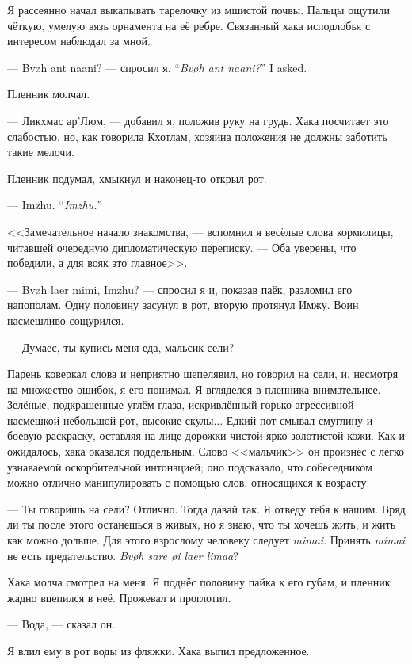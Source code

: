 Я рассеянно начал выкапывать тарелочку из мшистой почвы.
Пальцы ощутили чёткую, умелую вязь орнамента на её ребре.
Связанный хака исподлобья с интересом наблюдал за мной.

{--- Bv\o h ant naani? --- спросил я.}
{``\textit{Bv\o{}h ant naani?}'' I asked.}

Пленник молчал.

--- Ликхмас ар'Люм, --- добавил я, положив руку на грудь.
Хака посчитает это слабостью, но, как говорила Кхотлам, хозяина положения не должны заботить такие мелочи.

Пленник подумал, хмыкнул и наконец-то открыл рот.

{--- Imzhu.}
{``\textit{Imzhu.}''}

<<Замечательное начало знакомства, --- вспомнил я весёлые слова кормилицы, читавшей очередную дипломатическую переписку.
--- Оба уверены, что победили, а для вояк это главное>>.

--- Bv\o{}h laer mimi, Imzhu? --- спросил я и, показав паёк, разломил его напополам.
Одну половину засунул в рот, вторую протянул Имжу.
Воин насмешливо сощурился.

--- Думаес, ты купись меня еда, мальсик сели?

Парень коверкал слова и неприятно шепелявил, но говорил на сели, и, несмотря на множество ошибок, я его понимал.
Я вгляделся в пленника внимательнее.
Зелёные, подкрашенные углём глаза, искривлённый горько-агрессивной насмешкой небольшой рот, высокие скулы...
Едкий пот смывал смуглину и боевую раскраску, оставляя на лице дорожки чистой ярко-золотистой кожи.
Как и ожидалось, хака оказался поддельным.
Слово <<мальчик>> он произнёс с легко узнаваемой оскорбительной интонацией;
оно подсказало, что собеседником можно отлично манипулировать с помощью слов, относящихся к возрасту.

--- Ты говоришь на сели?
Отлично.
Тогда давай так.
Я отведу тебя к нашим.
Вряд ли ты после этого останешься в живых, но я знаю, что ты хочешь жить, и жить как можно дольше.
Для этого взрослому человеку следует \textit{mimai}\FM.
Принять \textit{mimai} не есть предательство.
\textit{Bv\o{}h sare \o{}i laer limaa}\FM?

Хака молча смотрел на меня.
Я поднёс половину пайка к его губам, и пленник жадно вцепился в неё.
Прожевал и проглотил.

--- Вода, --- сказал он.

Я влил ему в рот воды из фляжки.
Хака выпил предложенное.

